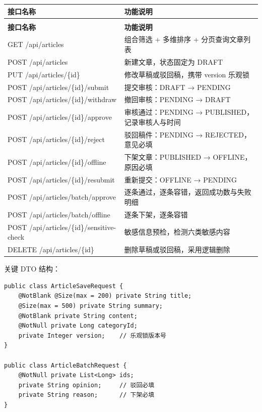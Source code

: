 \documentclass[zihao=-4,UTF8,openany]{ctexart}
\renewcommand{\_}{\textunderscore\allowbreak}
\begin{document}
\begin{longtable}{@{}>{\raggedright\arraybackslash}p{5.8cm}>{\raggedright\arraybackslash}p{7.0cm}@{}}
\toprule
\textbf{接口名称} & \textbf{功能说明} \\
\midrule
\endfirsthead
\multicolumn{2}{@{}l}{\small（续表）}\\
\toprule
\textbf{接口名称} & \textbf{功能说明} \\
\midrule
\endhead
GET /api/articles & 组合筛选 + 多维排序 + 分页查询文章列表 \\
POST /api/articles & 新建文章，状态固定为 DRAFT \\
PUT /api/articles/\{id\} & 修改草稿或驳回稿，携带 version 乐观锁 \\
POST /api/articles/\{id\}/submit & 提交审核：DRAFT → PENDING \\
POST /api/articles/\{id\}/withdraw & 撤回审核：PENDING → DRAFT \\
POST /api/articles/\{id\}/approve & 审核通过：PENDING → PUBLISHED，记录审核人与时间 \\
POST /api/articles/\{id\}/reject & 驳回稿件：PENDING → REJECTED，意见必填 \\
POST /api/articles/\{id\}/offline & 下架文章：PUBLISHED → OFFLINE，原因必填 \\
POST /api/articles/\{id\}/resubmit & 重新提交：OFFLINE → PENDING \\
POST /api/articles/batch/approve & 逐条通过，逐条容错，返回成功数与失败明细 \\
POST /api/articles/batch/offline & 逐条下架，逐条容错 \\
POST /api/articles/\{id\}/sensitive-check & 敏感信息预检，检测六类敏感内容 \\
DELETE /api/articles/\{id\} & 删除草稿或驳回稿，采用逻辑删除 \\
\bottomrule
\end{longtable}

关键 DTO 结构：

\begin{verbatim}
public class ArticleSaveRequest {
    @NotBlank @Size(max = 200) private String title;
    @Size(max = 500) private String summary;
    @NotBlank private String content;
    @NotNull private Long categoryId;
    private Integer version;    // 乐观锁版本号
}

public class ArticleBatchRequest {
    @NotNull private List<Long> ids;
    private String opinion;     // 驳回必填
    private String reason;      // 下架必填
}
\end{verbatim}
\end{document}
